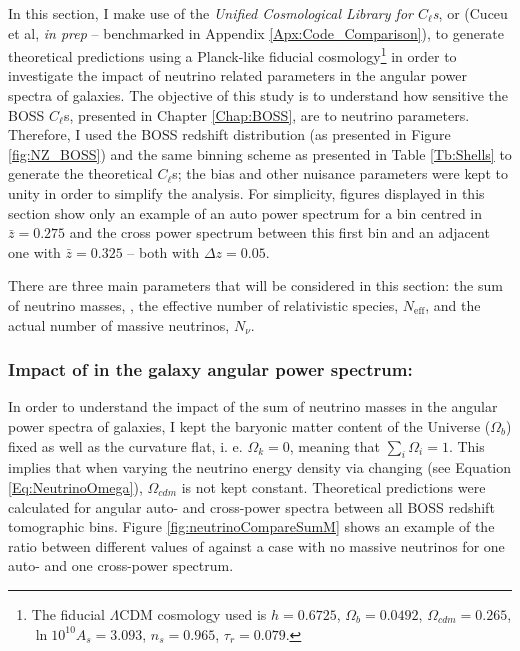 \qquad In this section, I make use of the \textit{Unified Cosmological Library for $C_{\ell}$s}, or \uclcl (Cuceu et al, \textit{in prep} -- benchmarked in Appendix \ref{Apx:Code_Comparison}), to generate theoretical predictions using a Planck-like fiducial cosmology\footnote{The fiducial $\Lambda$CDM cosmology used is $h=0.6725$, $\Omega_b = 0.0492$, $\Omega_{cdm} = 0.265$, $\ln 10^{10}A_s = 3.093$, $n_s = 0.965$, $\tau_r = 0.079$.} in order to investigate the impact of neutrino related parameters in the angular power spectra of galaxies. The objective of this study is to understand how sensitive the BOSS $C_{\ell}$s, presented in Chapter \ref{Chap:BOSS}, are to neutrino parameters. Therefore, I used the BOSS redshift distribution (as presented in Figure \ref{fig:NZ_BOSS}) and the same binning scheme as presented in Table \ref{Tb:Shells} to generate the theoretical $C_{\ell}$s; the bias and other nuisance parameters were kept to unity in order to simplify the analysis. For simplicity, figures displayed in this section show only an example of an auto power spectrum for a bin centred in $\bar{z} = 0.275$ and the cross power spectrum between this first bin and an adjacent one with $\bar{z} = 0.325$ -- both with $\Delta z = 0.05$.

\qquad There are three main parameters that will be considered in this section: the sum of neutrino masses, \NM{}, the effective number of relativistic species, $N_{\text{eff}}$, and the actual number of massive neutrinos, $N_{\nu}$.

\subsubsection{Impact of \NM{} in the galaxy angular power spectrum:}
In order to understand the impact of the sum of neutrino masses in the angular power spectra of galaxies, I kept the baryonic matter content of the Universe ($\Omega_b$) fixed as well as the curvature flat, i. e. $\Omega_{k} = 0$, meaning that $\sum_i \Omega_i = 1$. This implies that when varying the neutrino energy density via changing \NM{} (see Equation \ref{Eq:NeutrinoOmega}), $\Omega_{cdm}$ is not kept constant. Theoretical predictions were calculated for angular auto- and cross-power spectra between all BOSS redshift tomographic bins. Figure \ref{fig:neutrinoCompareSumM} shows an example of the ratio between different values of \NM{} against a case with no massive neutrinos for one auto- and one cross-power spectrum.

